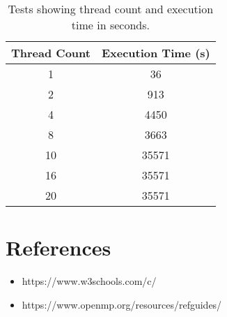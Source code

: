 \documentclass{article}
\begin{document}

	
	\begin{table}[t]
		\centering
		\begin{tabular}{|c|c|}
			\hline
			\textbf{Thread Count} & \textbf{Execution Time (s)} \\
			\hline
			1 & 36 \\
			2 & 913 \\
			4 & 4450 \\
			8 & 3663 \\
			10 & 35571 \\
			16 & 35571 \\
			20 & 35571 \\
			\hline
		\end{tabular}
		\caption{Tests showing thread count and execution time in seconds.}
		\label{table2}
	\end{table}
	
	\section{References}
	\begin{itemize}
		\item https://www.w3schools.com/c/
		\item https://www.openmp.org/resources/refguides/
	\end{itemize}
	
\end{document}
